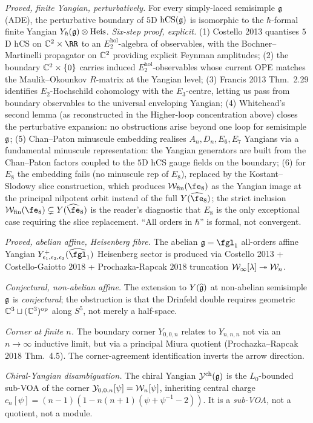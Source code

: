\begin{theorem}
\label{wn:thm:spine-5d-hCS-yangian}
\emph{Proved, finite Yangian, perturbatively.} For every simply-laced
semisimple $\mathfrak{g}$ (ADE), the perturbative boundary of $5$D $\mathrm{hCS}(\mathfrak{g})$
is isomorphic to the $\hbar$-formal finite Yangian
$Y_\hbar(\mathfrak{g}) \otimes \mathrm{Heis}$. \emph{Six-step proof, explicit.}
(1) Costello 2013 quantises $5$D hCS on $\CC^2 \times \RR$ to an
$E_2^{\mathrm{hol}}$-algebra of observables, with the Bochner--Martinelli
propagator on $\mathbb{C}^2$ providing explicit Feynman amplitudes;
(2) the boundary $\mathbb{C}^2 \times \{0\}$ carries induced
$E_2^{\mathrm{hol}}$-observables whose current OPE matches the
Maulik--Okounkov $R$-matrix at the Yangian level; (3) Francis 2013
Thm.~2.29 identifies $E_2$-Hochschild cohomology with the
$E_3$-centre, letting us pass from boundary observables to the
universal enveloping Yangian; (4) Whitehead's second lemma
(as reconstructed in the Higher-loop concentration above) closes
the perturbative expansion: no obstructions arise beyond one loop for
semisimple $\mathfrak{g}$; (5) Chan--Paton minuscule embedding realises
$A_n, D_n, E_6, E_7$ Yangians via a fundamental minuscule
representation: the Yangian generators are built from the
Chan--Paton factors coupled to the $5$D hCS gauge fields on the
boundary; (6) for $E_8$ the embedding fails (no minuscule rep of
$E_8$), replaced by the Kostant--Slodowy slice construction, which
produces $\cW_{\mathrm{fin}}(\fe_8)$ as the Yangian image at the
principal nilpotent orbit instead of the full $Y(\widehat{\fe}_8)$;
the strict inclusion $\cW_{\mathrm{fin}}(\fe_8) \subsetneq
Y(\widehat{\fe}_8)$ is the reader's diagnostic that $E_8$ is the
only exceptional case requiring the slice replacement. ``All orders
in $\hbar$'' is formal, not convergent.

\emph{Proved, abelian affine, Heisenberg fibre.} The abelian
$\fg = \fgl_1$ all-orders affine Yangian
$Y^+_{\epsilon_1, \epsilon_2, \epsilon_3}(\widehat{\fgl}_1)$
Heisenberg sector is produced via Costello 2013 + Costello-Gaiotto
$2018$ + Prochazka-Rapcak $2018$ truncation
$\mathcal{W}_\infty[\lambda] \twoheadrightarrow \mathcal{W}_n$.

\emph{Conjectural, non-abelian affine.} The extension to
$Y(\widehat{\mathfrak{g}})$ at non-abelian semisimple $\mathfrak{g}$ is \emph{conjectural};
the obstruction is that the Drinfeld double requires geometric
$\mathbb{C}^3 \sqcup (\mathbb{C}^3)^{\mathrm{op}}$ along $S^5$, not merely a
half-space.

\emph{Corner at finite $n$.} The boundary corner $Y_{0,0,n}$ relates to
$Y_{n,n,n}$ not via an $n \to \infty$ inductive limit, but via a
principal Miura quotient (Prochazka--Rapcak $2018$ Thm.~4.5). The
corner-agreement identification inverts the arrow direction.

\emph{Chiral-Yangian disambiguation.} The chiral Yangian
$\mathcal{Y}^{\mathrm{ch}}(\mathfrak{g})$ is the $L_0$-bounded sub-VOA of the
corner $\mathcal{Y}_{0,0,n}[\psi] = \mathcal{W}_n[\psi]$, inheriting central
charge $c_n[\psi] = (n-1)(1 - n(n+1)(\psi + \psi^{-1} - 2))$. It is a
\emph{sub-VOA}, not a quotient, not a module.
\end{theorem}

